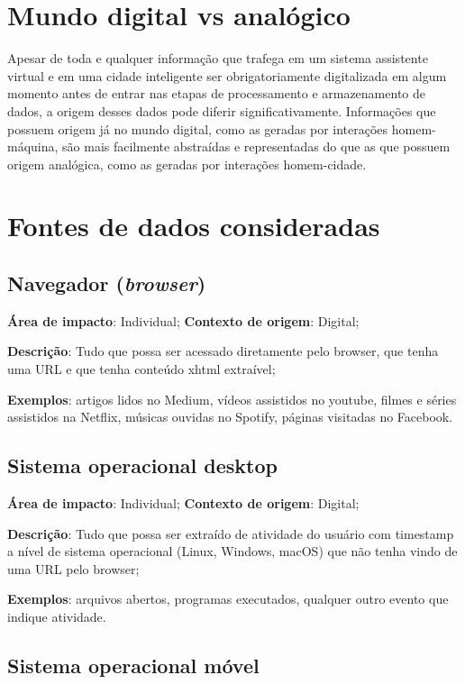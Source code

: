 \section{Mundo digital vs analógico}

Apesar de toda e qualquer informação que trafega em um sistema assistente virtual e em uma cidade inteligente ser obrigatoriamente digitalizada em algum momento antes de entrar nas etapas de processamento e armazenamento de dados, a origem desses dados pode diferir significativamente. Informações que possuem origem já no mundo digital, como as geradas por interações homem-máquina, são mais facilmente abstraídas e representadas do que as que possuem origem analógica, como as geradas por interações homem-cidade.

\section{Fontes de dados consideradas}

\subsection{Navegador (\textit{browser})}

\textbf{Área de impacto}: Individual; \textbf{Contexto de origem}: Digital;

\textbf{Descrição}: Tudo que possa ser acessado diretamente pelo browser, que tenha uma URL e que tenha conteúdo xhtml extraível;

\textbf{Exemplos}: artigos lidos no Medium, vídeos assistidos no youtube, filmes e séries assistidos na Netflix, músicas ouvidas no Spotify, páginas visitadas no Facebook.

\subsection{Sistema operacional desktop}

\textbf{Área de impacto}: Individual; \textbf{Contexto de origem}: Digital;

\textbf{Descrição}: Tudo que possa ser extraído de atividade do usuário com timestamp a nível de sistema operacional (Linux, Windows, macOS) que não tenha vindo de uma URL pelo browser;

\textbf{Exemplos}: arquivos abertos, programas executados, qualquer outro evento que indique atividade.

\subsection{Sistema operacional móvel}

